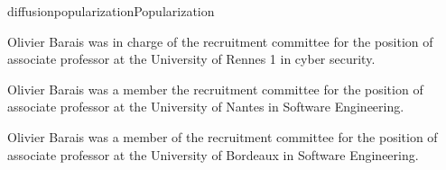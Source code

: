 \documentclass{ra2018}
\begin{document}
\begin{module}{diffusion}{popularization}{Popularization}
\begin{description}
	\item Olivier Barais was in charge of the recruitment committee for the position of associate professor at the University of Rennes 1 in cyber security.
	\item Olivier Barais was a member the recruitment committee for the position of associate professor at the University of Nantes in Software Engineering.
	\item Olivier Barais was a member of the recruitment committee for the position of associate professor at the University of Bordeaux in Software Engineering.
\end{description}






\end{module}
\end{document}
